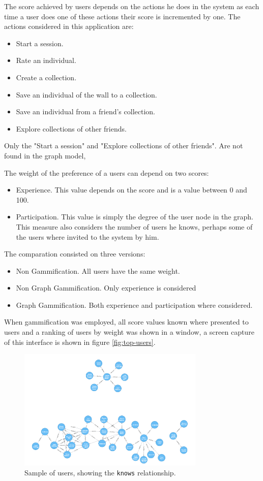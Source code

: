 \documentclass[conference]{IEEEtran}
\begin{document}
The score achieved by users depends on the actions he does in the system as
each time a user does one of these actions their score is incremented by one.
The actions considered in this application are: 
\begin{itemize}
\item Start a session.
\item Rate an individual.
\item Create a collection.
\item Save an individual of the wall to a collection.
\item Save an individual from a friend's collection.
\item Explore collections of other friends.
\end{itemize}
Only the "Start a session" and "Explore collections of other friends". 
Are not found in the graph model, 

The weight of the preference of a users can depend on two scores:
\begin{itemize}
\item Experience. This value depends on the score and is a value 
between 0 and 100.

\item Participation. This value is simply the degree of the user node 
in the graph. This measure also considers the number of users he knows,
perhaps some of the users where invited to the system by him.   
\end{itemize}

The comparation consisted on three versions:
\begin{itemize}
\item Non Gammification. All users have the same weight.
\item Non Graph Gammification. Only experience is considered
\item Graph Gammification. Both experience and participation where considered.
\end{itemize}
When gammification was employed, all score values known where presented to users
and a ranking of users by weight was shown in a window, a screen capture of
this interface is shown in figure \ref{fig:top-users}. 

\begin{figure}[!t]
    \centering
        \includegraphics[width=3.5in]{img/user_known_2.png}
    \caption{Sample of users, showing the {\tt knows} relationship.}
    \label{fig:users-graph}
\end{figure}
\end{document}
